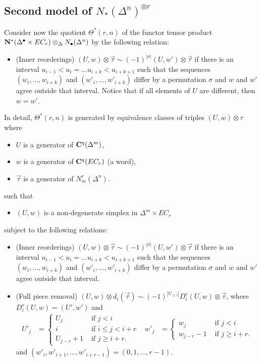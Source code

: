 \subsection{Second model of $N_*(\Delta^n)^{\otimes r}$} Consider now the quotient $\Theta^*(r,n)$ of the functor tensor product $\mathbf{N}^*(\Delta^\bullet\times EC_r)\otimes_\Delta N_\bullet(\Delta^n)$
by the following relation:
\begin{itemize}
    	\item (Inner reorderings) $(U,w)\otimes \vec{\tau}\sim (-1)^{|\sigma|}(U,w')\otimes \vec{\tau}$ if there is an interval $u_{i-1}<u_i =\ldots u_{i+k}<u_{i+k+1}$ such that the sequences $(w_i,\ldots,w_{i+k})$ and $(w'_i,\ldots,w'_{i+k})$ differ by a permutation $\sigma$ and $w$ and $w'$ agree outside that interval. Notice that if all elements of $U$ are different, then $w=w'$.
\end{itemize}
In detail, $\Theta^*(r,n)$ is generated by equivalence classes of triples $(U,w)\otimes \tau$ where
\begin{itemize}
	\item $U$ is a generator of $\mathbf{C}^q(\Delta^m)$,
	\item $w$ is a generator of $\mathbf{C}^q(EC_r)$ (a word),
	\item $\vec{\tau}$ is a generator of $N_m^r(\Delta^n)$.
\end{itemize}
such that
\begin{itemize}
	\item $(U,w)$ is a non-degenerate simplex in $\Delta^m\times EC_r$
\end{itemize}
subject to the following relations:
\begin{itemize}
	\item (Inner reorderings) $(U,w)\otimes\vec{\tau}\sim (-1)^{|\sigma|}(U,w')\otimes \vec{\tau}$ if there is an interval $u_{i-1}<u_i =\ldots u_{i+k}<u_{i+k+1}$ such that the sequences $(w_i,\ldots,w_{i+k})$ and $(w'_i,\ldots,w'_{i+k})$ differ by a permutation $\sigma$ and $w$ and $w'$ agree outside that interval.
	\item (Full piece removal) $(U,w)\otimes d_i(\vec{\tau})\sim (-1)^{|U_{\ge i}|}D_i^r(U,w)\otimes \vec{\tau}$, where $D_i^r(U,w) = (U',w')$ and
	\begin{align*}
		U'_j &= \begin{cases} U_j &\text{ if $j<i$} \\ i & \text{ if $i\leq j < i+r$} \\ U_{j-r} + 1 & \text{ if $j\geq i+r$.}\end{cases} &
		w'_j &= \begin{cases} w_j &\text{ if $j<i$} \\ w_{j-r} - 1 & \text{ if $j\geq i+r$.}\end{cases}
	\end{align*}
	and $(w'_{i},w'_{i+1},\ldots,w'_{i+r-1}) = (0,1,\ldots,r-1)$.
\end{itemize}
